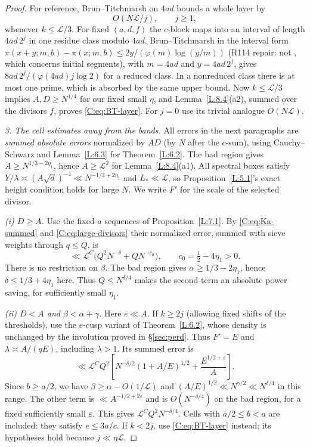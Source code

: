 \documentclass[10pt,reqno]{amsart}
\theoremstyle{definition}
\numberwithin{equation}{section}
\newcommand{\cL}{\mathcal L}
\begin{document}
\begin{proof}
For reference, Brun--Titchmarsh on $4ad$ bounds a whole layer by
\begin{equation}\label{C:eq:BT-layer}
 O(N\cL/j),\qquad j\geq1,
\end{equation}
whenever $k\leq\cL/3$.  For fixed $(a,d,f)$ the $c$-block maps into
an interval of length $4ad\,2^j$ in one residue class modulo $4ad$.
Brun--Titchmarsh in the interval form
$\pi(x+y;m,b)-\pi(x;m,b)\le2y/(\varphi(m)\log(y/m))$ \cite{MV}
(R114 repair: not \cite[(A.10)]{ET}, which concerns initial segments),
with $m=4ad$ and $y=4ad\,2^j$, gives
$8ad\,2^j/(\varphi(4ad)j\log2)$ for a reduced class.  In a
nonreduced class there is at most one prime, which is absorbed by the
same upper bound.  Now $k\leq\cL/3$ implies $A,D\geq N^{1/4}$ for
our fixed small $\eta$, and Lemma~\ref{L:8.4}(a2), summed over the
divisors $f$, proves \eqref{C:eq:BT-layer}.  For $j=0$ use its trivial
analogue $O(N\cL)$.

\smallskip\noindent
\emph{3. The cell estimates away from the bands.}
All errors in the next paragraphs are \emph{summed absolute errors}
normalized by $AD$ (by $N$ after the $c$-sum), using Cauchy--Schwarz
and Lemma~\ref{L:6.3} for Theorem~\ref{L:6.2}. The bad region gives
$A\ge N^{1/3-2\eta_1}$, hence $A\ge\cL^2$ for Lemma~\ref{L:8.4}(a1).
All spectral boxes satisfy $Y/\lambda\asymp(A\sqrt d)^{-1}
\ll N^{-1/3+2\eta_1}$ and $L_*\ll\cL$, so Proposition~\ref{L:5.1}'s
exact height condition holds for large $N$. We write $F'$ for the scale of the selected divisor.

\emph{(i) $D\geq A$.}
Use the fixed-$a$ sequences of Proposition~\ref{L:7.1}.
By \eqref{C:eq:Ka-summed} and \eqref{C:eq:large-divisors} their
normalized error, summed with sieve weights through $q\leq Q$, is
\[
 \ll\cL^C\bigl(Q^2N^{-\delta}+QN^{-c_0}\bigr),
 \qquad c_0=\tfrac12-4\eta_1>0.
\]
There is no restriction on $\beta$.  The bad region gives
$\alpha\geq1/3-2\eta_1$, hence $\delta\leq1/3+4\eta_1$ here.
Thus $Q\leq N^{\delta/4}$ makes the second term an absolute power
saving, for sufficiently small $\eta_1$.

\emph{(ii) $D<A$ and $\beta<\alpha+\gamma$.}
Here $e\ll A$.  If $k\geq2j$ (allowing fixed shifts of the thresholds),
use the $e$-cusp variant of Theorem~\ref{L:6.2}, whose density is
unchanged by the involution proved in \S\ref{sec:perd}. Thus $F'=E$ and
$\lambda\asymp A/(qE)$, including $\lambda>1$.
Its summed error is
\begin{equation}\label{C:eq:e-cusp}
 \ll\cL^C Q^2
 \left[N^{-\delta/2}(1+A/E)^{1/2}
       +\frac{E^{1/2+\varepsilon}}A\right].
\end{equation}
Since $b\geq a/2$, we have $\beta\geq\alpha-O(1/\cL)$ and
$(A/E)^{1/2}\ll N^{\gamma/2}\ll N^{\delta/4}$ in this range.
The other term is $\ll A^{-1/2+2\varepsilon}$ and is
$O(N^{-\delta/4})$ on the bad region, for a fixed sufficiently small
$\varepsilon$.  This gives $\cL^CQ^2N^{-\delta/4}$.
Cells with $a/2\leq b<a$ are included: they satisfy $e\leq3a/c$.
If $k<2j$, use \eqref{C:eq:BT-layer} instead; its hypotheses hold
because $j\ll\eta\cL$.


\end{proof}
\end{document}
